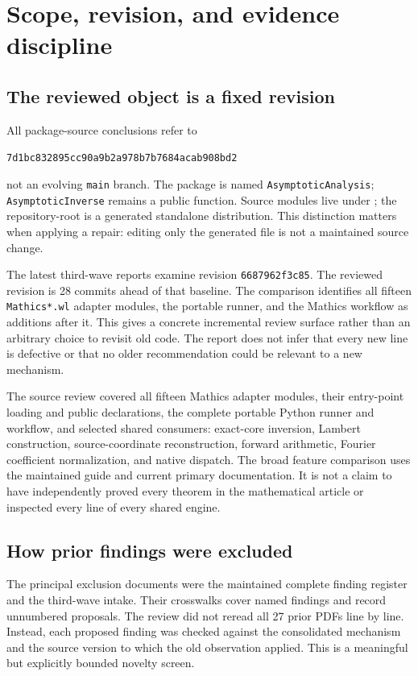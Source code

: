 \documentclass[11pt,a4paper]{article}
\newcommand{\code}[1]{\texttt{#1}}
\newcommand{\pin}{7d1bc832895cc90a9b2a978b7b7684acab908bd2}
\begin{document}
\clearpage
\tableofcontents
\clearpage

\section{Scope, revision, and evidence discipline}
\subsection{The reviewed object is a fixed revision}
All package-source conclusions refer to
\begin{center}\small\texttt{\pin}\end{center}
not an evolving \code{main} branch. The package is named \code{AsymptoticAnalysis}; \code{AsymptoticInverse} remains a public function. Source modules live under ; the repository-root  is a generated standalone distribution. This distinction matters when applying a repair: editing only the generated file is not a maintained source change.\cite{repo,coreentry}

The latest third-wave reports examine revision \code{6687962f3c85}. The reviewed revision is 28 commits ahead of that baseline. The comparison identifies all fifteen \code{Mathics*.wl} adapter modules, the portable runner, and the Mathics workflow as additions after it. This gives a concrete incremental review surface rather than an arbitrary choice to revisit old code. The report does not infer that every new line is defective or that no older recommendation could be relevant to a new mechanism.\cite{comparison,intake}

The source review covered all fifteen Mathics adapter modules, their entry-point loading and public declarations, the complete portable Python runner and workflow, and selected shared consumers: exact-core inversion, Lambert construction, source-coordinate reconstruction, forward arithmetic, Fourier coefficient normalization, and native dispatch. The broad feature comparison uses the maintained guide and current primary documentation. It is not a claim to have independently proved every theorem in the mathematical article or inspected every line of every shared engine.

\subsection{How prior findings were excluded}
The principal exclusion documents were the maintained complete finding register and the third-wave intake. Their crosswalks cover named findings and record unnumbered proposals. The review did not reread all 27 prior PDFs line by line. Instead, each proposed finding was checked against the consolidated mechanism and the source version to which the old observation applied. This is a meaningful but explicitly bounded novelty screen.\cite{register,intake}
\end{document}
